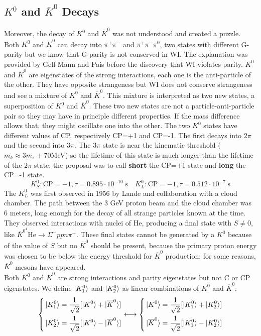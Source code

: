 \documentclass[10.75pt,a4paper,openright,bottom=2cm]{article}
\begin{document}
\subsection{$K^0$ and $\overline{K}^0$ Decays}
Moreover, the decay of $K^0$ and $\overline{K}^0$ was not understood and created a puzzle. Both $K^0$ and $\overline{K}^0$ can decay into $\pi^+\pi^-$ and $\pi^+\pi^-\pi^0$, two states with different G-parity but we know that G-parity is not conserved in WI. The explanation was provided by Gell-Mann and Pais before the discovery that WI violates parity. $K^0$ and $\overline{K}^0$ are eigenstates of the strong interactions, each one is the anti-particle of the other. They have opposite strangeness but WI does not conserve strangeness and see a mixture of $K^0$ and $\overline{K}^0$. This mixture is interpreted as two new states, a superposition of $K^0$ and $\overline{K}^0$. These two new states are not a particle-anti-particle pair so they may have in principle different properties. If the mass difference allows that, they might oscillate one into the other. The two $K^0$ states have different values of CP, respectively CP=+1 and CP=-1. The first decays into $2\pi$ and the second into $3\pi$. The $3\pi$ state is near the kinematic threshold ($m_k\approx3m_\pi+70$\;MeV) so the lifetime of this state is much longer than the lifetime of the $2\pi$ state: the proposal was to call \textbf{short} the CP=+1 state and \textbf{long} the CP=-1 state.
\[
K_S^0: \text{CP}=+1, \tau=0.895\cdot10^{-10}\;\text{s} \quad K_L^0: \text{CP}=-1, \tau=0.512\cdot10^{-7}\;\text{s}
\]
The $K_L^0$ was first observed in 1956 by Lande and collaboration with a cloud chamber. The path between the 3 GeV proton beam and the cloud chamber was 6 meters, long enough for the decay of all strange particles known at the time. They observed interactions with nuclei of He, producing a final state with $S\neq0$, like $\overline{K}^0 ^4\text{He}\to\Sigma^-ppn\pi^+$. These final states cannot be generated by a $K^0$ because of the value of $S$ but no $\overline{K}^0$ should be present, because the primary proton energy was chosen to be below the energy threshold for $\overline{K}^0$ production: for some reasons, $\overline{K}^0$ mesons have appeared.\\
Both $K^0$ and $\overline{K}^0$ are strong interactions and parity eigenstates but not C or CP eigenstates. We define $\ket{K_1^0}$ and $\ket{K_2^0}$ as linear combinations of $K^0$ and $\overline{K}^0$:
\[
\left\{
\begin{aligned}
&\ket{K_1^0}=\frac{1}{\sqrt{2}}[\ket{K^0}+\ket{\overline{K}^0}]\\    
&\ket{K_2^0}=\frac{1}{\sqrt{2}}[\ket{K^0}-\ket{\overline{K}^0}]
\end{aligned}
\right.
\longleftrightarrow
\left\{
\begin{aligned}
&\ket{K^0}=\frac{1}{\sqrt{2}}[\ket{K_1^0}+\ket{K_2^0}]\\ 
&\ket{\overline{K}^0}=\frac{1}{\sqrt{2}}[\ket{K_1^0}-\ket{K_2^0}]
\end{aligned}
\right.
\]
\end{document}
